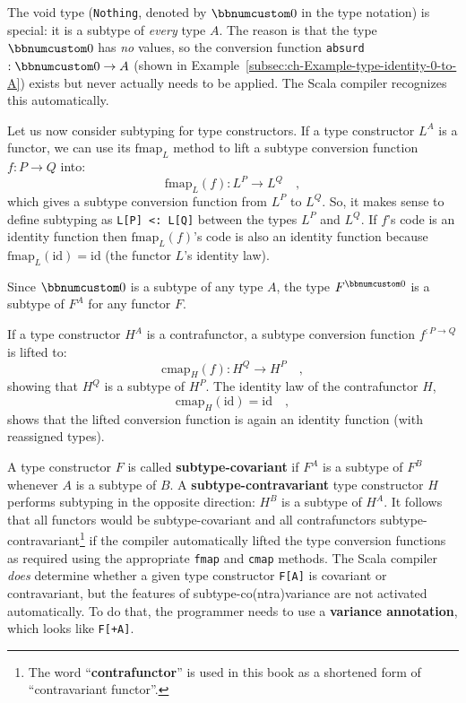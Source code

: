 The void type (\lstinline!Nothing!, denoted by $\bbnum 0$ in the
type notation) is special: it is a subtype of \emph{every}
type $A$. The reason is that the type $\bbnum 0$ has \emph{no} values,
so the conversion function \lstinline!absurd! $:\bbnum 0\rightarrow A$
(shown in Example~\ref{subsec:ch-Example-type-identity-0-to-A})
exists but never actually needs to be applied. The Scala compiler
recognizes this automatically.

Let us now consider subtyping for type constructors. If a type constructor
$L^{A}$ is a functor, we can use its $\text{fmap}_{L}$ method to
lift a subtype conversion function $f:P\rightarrow Q$ into:
\[
\text{fmap}_{L}(f):L^{P}\rightarrow L^{Q}\quad,
\]
which gives a subtype conversion function from $L^{P}$ to $L^{Q}$.
So, it makes sense to define subtyping as \lstinline!L[P] <: L[Q]!
between the types $L^{P}$ and $L^{Q}$. If $f$\textsf{'}s code is an identity
 function then $\text{fmap}_{L}(f)$\textsf{'}s code is also an identity function
because $\text{fmap}_{L}(\text{id})=\text{id}$ (the functor $L$\textsf{'}s
identity law).

Since $\bbnum 0$ is a subtype of any type $A$, the type $F^{\bbnum 0}$
is a subtype of $F^{A}$ for any functor $F$.

If a type constructor $H^{A}$ is a contrafunctor, a subtype conversion
function $f^{:P\rightarrow Q}$ is lifted to:
\[
\text{cmap}_{H}(f):H^{Q}\rightarrow H^{P}\quad,
\]
showing that $H^{Q}$ is a subtype of $H^{P}$. The identity law of
the contrafunctor $H$,
\[
\text{cmap}_{H}(\text{id})=\text{id}\quad,
\]
shows that the lifted conversion function is again an identity function
(with reassigned types).

A type constructor $F$ is called \textbf{subtype-covariant}
if $F^{A}$ is a subtype of $F^{B}$ whenever $A$ is a subtype of
$B$. A \textbf{subtype-contravariant}
type constructor $H$ performs subtyping in the opposite direction:
$H^{B}$ is a subtype of $H^{A}$. It follows that all functors would
be subtype-covariant and all contrafunctors subtype-contravariant\footnote{The word \textsf{``}\textbf{contrafunctor}\textsf{''} is used
in this book as a shortened form of \textsf{``}contravariant
functor\textsf{''}.} if the compiler automatically lifted the type conversion functions
as required using the appropriate \lstinline!fmap! and \lstinline!cmap!
methods. The Scala compiler \emph{does} determine whether a given
type constructor \lstinline!F[A]! is covariant or contravariant,
but the features of subtype-co(ntra)variance are not activated automatically.
To do that, the programmer needs to use a \textbf{variance
annotation}, which looks like \lstinline!F[+A]!.

